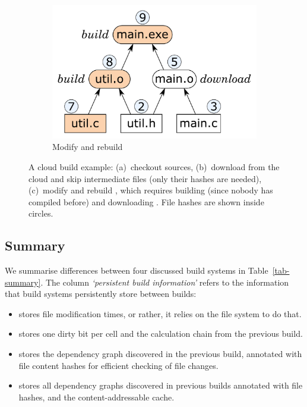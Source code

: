 \begin{figure}[t]
\begin{subfigure}[b]{0.31\linewidth}
\centerline{\includegraphics[scale=0.28]{fig/bazel-example-rebuild.pdf}}
\caption{Modify  and rebuild}
\end{subfigure}
\caption{A cloud build example: (a)~checkout sources, (b)~download 
from the cloud and skip intermediate files (only their hashes are needed),
(c)~modify  and rebuild , which requires building
 (since nobody has compiled  before) and downloading
. File hashes are shown inside circles.
\label{fig-bazel}}
\end{figure}

\subsection{Summary}
\label{sec-background-summary}

We summarise differences between four discussed build systems in
Table~\ref{tab-summary}. The column \emph{`persistent build information'} refers
to the information that build systems persistently store between builds:
\begin{itemize}
    \item \Make stores file modification times, or rather, it relies on the file
    system to do that.
    \item \Excel stores one dirty bit per cell and the calculation chain from
    the previous build.
    \item \Shake stores the dependency graph discovered in the previous build,
    annotated with file content hashes for efficient checking of file changes.
    \item \Bazel stores all dependency graphs discovered in previous builds
    annotated with file hashes, and the content-addressable cache.
\end{itemize}

